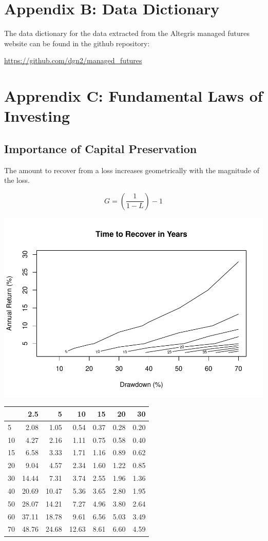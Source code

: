 \documentclass[]{article}
\begin{document}
\pagebreak

\section{Appendix B: Data Dictionary}\label{appendix-b-data-dictionary}

The data dictionary for the data extracted from the Altegris managed
futures website can be found in the github repository:

\url{https://github.com/dgn2/managed_futures}

\pagebreak

\section{Apprendix C: Fundamental Laws of
Investing}\label{apprendix-c-fundamental-laws-of-investing}

\subsection{Importance of Capital
Preservation}\label{importance-of-capital-preservation}

The amount to recover from a loss increases geometrically with the
magnitude of the loss.

\[G = \left(\frac{1}{1-L}\right)-1\]

\includegraphics{diversificationInTheManagedFuturesUniverse_files/figure-latex/unnamed-chunk-55-1.pdf}

\begin{longtable}[c]{@{}lrrrrrr@{}}
\toprule
& 2.5 & 5 & 10 & 15 & 20 & 30\tabularnewline
\midrule
\endhead
5 & 2.08 & 1.05 & 0.54 & 0.37 & 0.28 & 0.20\tabularnewline
10 & 4.27 & 2.16 & 1.11 & 0.75 & 0.58 & 0.40\tabularnewline
15 & 6.58 & 3.33 & 1.71 & 1.16 & 0.89 & 0.62\tabularnewline
20 & 9.04 & 4.57 & 2.34 & 1.60 & 1.22 & 0.85\tabularnewline
30 & 14.44 & 7.31 & 3.74 & 2.55 & 1.96 & 1.36\tabularnewline
40 & 20.69 & 10.47 & 5.36 & 3.65 & 2.80 & 1.95\tabularnewline
50 & 28.07 & 14.21 & 7.27 & 4.96 & 3.80 & 2.64\tabularnewline
60 & 37.11 & 18.78 & 9.61 & 6.56 & 5.03 & 3.49\tabularnewline
70 & 48.76 & 24.68 & 12.63 & 8.61 & 6.60 & 4.59\tabularnewline
\bottomrule
\end{longtable}
\end{document}

